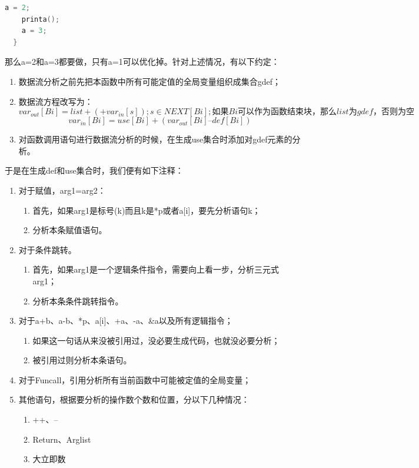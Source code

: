 \documentclass[12pt,a4paper,Flow]{report}
\begin{document}
\begin{enumerate}
\begin{lstlisting}[language=c]
    a = 2;
    printa();
    a = 3;
  }
\end{lstlisting}
那么a=2和a=3都要做，只有a=1可以优化掉。针对上述情况，有以下约定：
\begin{enumerate}
\item 数据流分析之前先把本函数中所有可能定值的全局变量组织成集合gdef；
\item 数据流方程改写为：
\begin{displaymath}
	var_{out}[Bi] = list+(+var_{in}[s]);s\in NEXT[Bi];如果Bi可以作为函数结束块，那么list为gdef，否则为空
\end{displaymath}
\begin{displaymath}
	var_{in}[Bi] = use[Bi] + (var_{out}[Bi] – def[Bi])
\end{displaymath}
\item 对函数调用语句进行数据流分析的时候，在生成use集合时添加对gdef元素的分析。
\end{enumerate}
\end{enumerate}
于是在生成def和use集合时，我们便有如下注释：
\begin{enumerate}
\item 对于赋值，arg1=arg2：
\begin{enumerate}
\item 首先，如果arg1是标号(k)而且k是*p或者a[i]，要先分析语句k；
\item 分析本条赋值语句。
\end{enumerate}
\item 对于条件跳转。
\begin{enumerate}
\item 首先，如果arg1是一个逻辑条件指令，需要向上看一步，分析三元式arg1；
\item 分析本条条件跳转指令。
\end{enumerate}
\item 对于a+b、a-b、*p、a[i]、+a、-a、\&a以及所有逻辑指令；
\begin{enumerate}
\item 如果这一句话从来没被引用过，没必要生成代码，也就没必要分析；
\item 被引用过则分析本条语句。
\end{enumerate}
\item 对于Funcall，引用分析所有当前函数中可能被定值的全局变量；
\item 其他语句，根据要分析的操作数个数和位置，分以下几种情况：
\begin{enumerate}
\item ++、--
\item Return、Arglist
\item 大立即数
\end{enumerate}
\end{enumerate}
\end{document}
